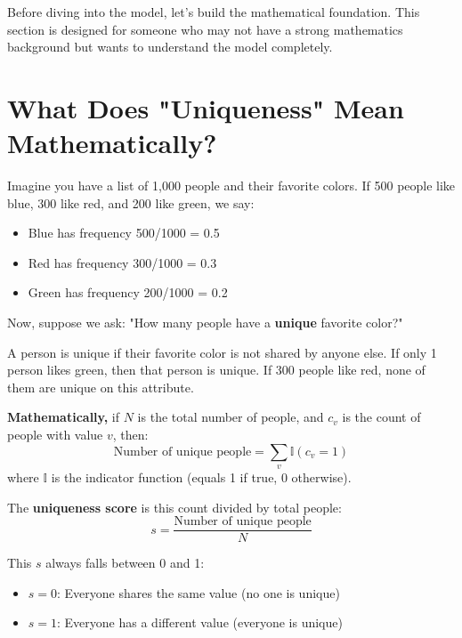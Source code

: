 \documentclass[12pt,a4paper,oneside,openany]{report}
\begin{document}
Before diving into the model, let's build the mathematical foundation. This section is designed for someone who may not have a strong mathematics background but wants to understand the model completely.

\section{What Does "Uniqueness" Mean Mathematically?}
\label{sec:uniqueness}

Imagine you have a list of 1,000 people and their favorite colors. If 500 people like blue, 300 like red, and 200 like green, we say:
\begin{itemize}
    \item Blue has frequency 500/1000 = 0.5
    \item Red has frequency 300/1000 = 0.3
    \item Green has frequency 200/1000 = 0.2
\end{itemize}

Now, suppose we ask: "How many people have a \textbf{unique} favorite color?"

A person is unique if their favorite color is not shared by anyone else. If only 1 person likes green, then that person is unique. If 300 people like red, none of them are unique on this attribute.

\textbf{Mathematically,} if $N$ is the total number of people, and $c_v$ is the count of people with value $v$, then:
\begin{equation}
\text{Number of unique people} = \sum_{v} \mathbb{I}(c_v = 1)
\end{equation}
where $\mathbb{I}$ is the indicator function (equals 1 if true, 0 otherwise).

The \textbf{uniqueness score} is this count divided by total people:
\begin{equation}
s = \frac{\text{Number of unique people}}{N}
\end{equation}

This $s$ always falls between 0 and 1:
\begin{itemize}
    \item $s = 0$: Everyone shares the same value (no one is unique)
    \item $s = 1$: Everyone has a different value (everyone is unique)
\end{itemize}

\end{document}
